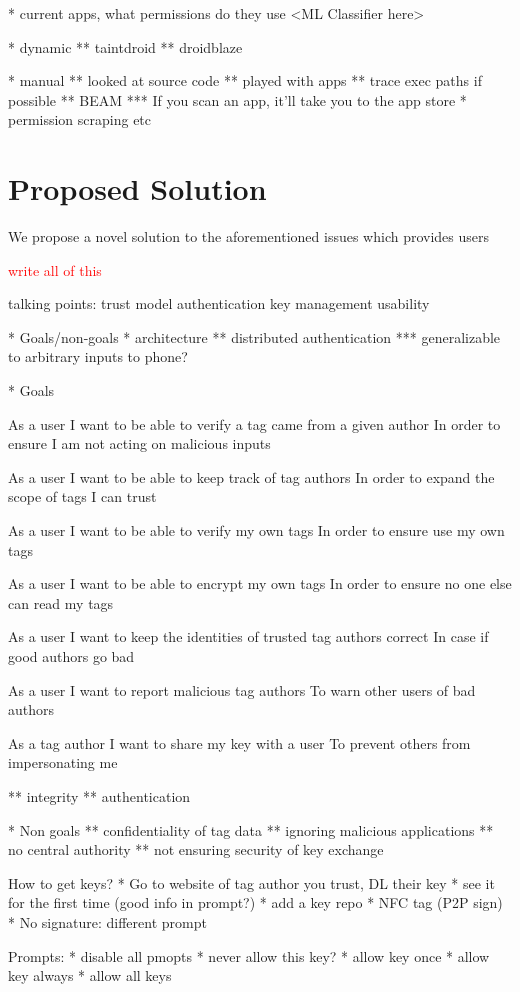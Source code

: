 \documentclass[12pt]{article}
\newcommand\TODO[1]{\textcolor{red}{#1}}
\begin{document}
* current apps, what permissions do they use
<ML Classifier here>

* dynamic
** taintdroid
** droidblaze

* manual
** looked at source code
** played with apps
** trace exec paths if possible
** BEAM
*** If you scan an app, it'll take you to the app store
* permission scraping etc

\section{Proposed Solution}
We propose a novel solution to the aforementioned issues which provides users 

\TODO{write all of this}

talking points:
trust model
authentication
key management
usability

* Goals/non-goals
* architecture
** distributed authentication
*** generalizable to arbitrary inputs to phone?

* Goals

As a user
I want to be able to verify a tag came from a given author
In order to ensure I am not acting on malicious inputs

As a user
I want to be able to keep track of tag authors
In order to expand the scope of tags I can trust

As a user
I want to be able to verify my own tags
In order to ensure use my own tags

As a user
I want to be able to encrypt my own tags
In order to ensure no one else can read my tags

As a user
I want to keep the identities of trusted tag authors correct
In case if good authors go bad

As a user
I want to report malicious tag authors
To warn other users of bad authors

As a tag author
I want to share my key with a user
To prevent others from impersonating me

** integrity
** authentication

* Non goals
** confidentiality of tag data
** ignoring malicious applications
** no central authority
** not ensuring security of key exchange


How to get keys?
* Go to website of tag author you trust, DL their key
* see it for the first time (good info in prompt?)
* add a key repo
* NFC tag (P2P sign)
* No signature: different prompt

Prompts:
* disable all pmopts
* never allow this key?
* allow key once
* allow key always
* allow all keys
\end{document}
